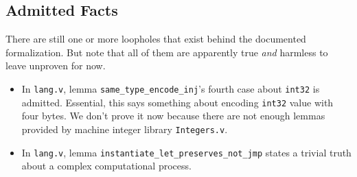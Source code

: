 \subsection{Admitted Facts}

There are still one or more loopholes that exist behind the documented formalization.
But note that all of them are apparently true \emph{and} harmless to leave unproven for now.

\begin{itemize}
\item In \texttt{lang.v}, lemma \texttt{same\_type\_encode\_inj}'s fourth case about \texttt{int32} is admitted.
  Essential, this says something about encoding \texttt{int32} value with four bytes.
  We don't prove it now because there are not enough lemmas provided by machine integer library \texttt{Integers.v}.
\item In \texttt{lang.v}, lemma \texttt{instantiate\_let\_preserves\_not\_jmp} states a trivial truth about a complex
  computational process.
\end{itemize}
